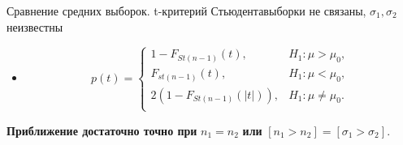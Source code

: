 \documentclass[11pt,pdf,utf8,hyperref={unicode},aspectratio=169]{beamer}
\begin{document}
\begin{frame}[label=ttest2u]{\hyperlink{onesample}{} Сравнение средних выборок. t-критерий Стьюдента}{выборки не связаны, $\sigma_1, \sigma_2$ неизвестны}
\begin{itemize}
        \item {}
        $$
        p\left(t\right) = \begin{cases}
            1-F_{St(n-1)}(t), & H_1 \colon \mu>\mu_0, \\
            F_{st(n-1)}(t), & H_1 \colon \mu < \mu_0, \\
            2\left(1-F_{St(n-1)}(|t|)\right), & H_1 \colon \mu\neq\mu_0. \\
        \end{cases}
        $$

    \end{itemize}

    \textbf{Приближение достаточно точно при} $n_1=n_2$ \textbf{или} $\left[n_1>n_2\right] = \left[\sigma_1>\sigma_2\right].$
\end{frame}
%
%
\end{document}
